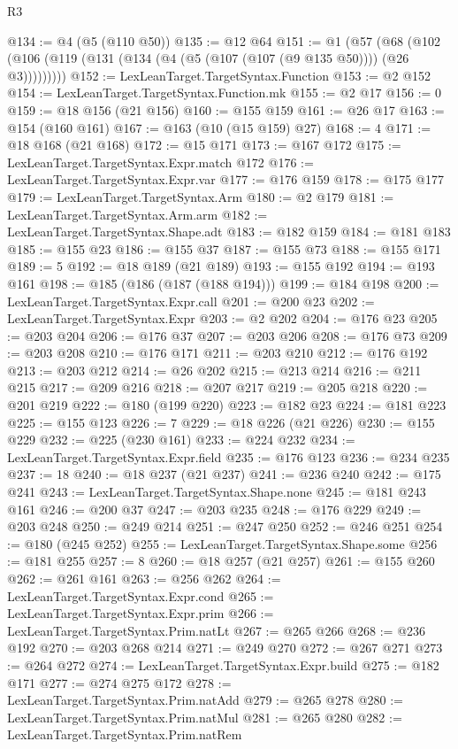 \begin{lexlean}{R3}
\begin{coremodule}
@134 := @4 (@5 (@110 @50))
@135 := @12 @64
@151 := @1
    (@57 (@68 (@102 (@106 (@119 (@131 (@134 (@4 (@5 (@107 (@107 (@9 @135 @50)))) (@26 @3)))))))))
@152 := LexLeanTarget.TargetSyntax.Function
@153 := @2 @152
@154 := LexLeanTarget.TargetSyntax.Function.mk
@155 := @2 @17
@156 := 0
@159 := @18 @156 (@21 @156)
@160 := @155 @159
@161 := @26 @17
@163 := @154 (@160 @161)
@167 := @163 (@10 (@15 @159) @27)
@168 := 4
@171 := @18 @168 (@21 @168)
@172 := @15 @171
@173 := @167 @172
@175 := LexLeanTarget.TargetSyntax.Expr.match @172
@176 := LexLeanTarget.TargetSyntax.Expr.var
@177 := @176 @159
@178 := @175 @177
@179 := LexLeanTarget.TargetSyntax.Arm
@180 := @2 @179
@181 := LexLeanTarget.TargetSyntax.Arm.arm
@182 := LexLeanTarget.TargetSyntax.Shape.adt
@183 := @182 @159
@184 := @181 @183
@185 := @155 @23
@186 := @155 @37
@187 := @155 @73
@188 := @155 @171
@189 := 5
@192 := @18 @189 (@21 @189)
@193 := @155 @192
@194 := @193 @161
@198 := @185 (@186 (@187 (@188 @194)))
@199 := @184 @198
@200 := LexLeanTarget.TargetSyntax.Expr.call
@201 := @200 @23
@202 := LexLeanTarget.TargetSyntax.Expr
@203 := @2 @202
@204 := @176 @23
@205 := @203 @204
@206 := @176 @37
@207 := @203 @206
@208 := @176 @73
@209 := @203 @208
@210 := @176 @171
@211 := @203 @210
@212 := @176 @192
@213 := @203 @212
@214 := @26 @202
@215 := @213 @214
@216 := @211 @215
@217 := @209 @216
@218 := @207 @217
@219 := @205 @218
@220 := @201 @219
@222 := @180 (@199 @220)
@223 := @182 @23
@224 := @181 @223
@225 := @155 @123
@226 := 7
@229 := @18 @226 (@21 @226)
@230 := @155 @229
@232 := @225 (@230 @161)
@233 := @224 @232
@234 := LexLeanTarget.TargetSyntax.Expr.field
@235 := @176 @123
@236 := @234 @235
@237 := 18
@240 := @18 @237 (@21 @237)
@241 := @236 @240
@242 := @175 @241
@243 := LexLeanTarget.TargetSyntax.Shape.none
@245 := @181 @243 @161
@246 := @200 @37
@247 := @203 @235
@248 := @176 @229
@249 := @203 @248
@250 := @249 @214
@251 := @247 @250
@252 := @246 @251
@254 := @180 (@245 @252)
@255 := LexLeanTarget.TargetSyntax.Shape.some
@256 := @181 @255
@257 := 8
@260 := @18 @257 (@21 @257)
@261 := @155 @260
@262 := @261 @161
@263 := @256 @262
@264 := LexLeanTarget.TargetSyntax.Expr.cond
@265 := LexLeanTarget.TargetSyntax.Expr.prim
@266 := LexLeanTarget.TargetSyntax.Prim.natLt
@267 := @265 @266
@268 := @236 @192
@270 := @203 @268 @214
@271 := @249 @270
@272 := @267 @271
@273 := @264 @272
@274 := LexLeanTarget.TargetSyntax.Expr.build
@275 := @182 @171
@277 := @274 @275 @172
@278 := LexLeanTarget.TargetSyntax.Prim.natAdd
@279 := @265 @278
@280 := LexLeanTarget.TargetSyntax.Prim.natMul
@281 := @265 @280
@282 := LexLeanTarget.TargetSyntax.Prim.natRem

\end{coremodule}
\end{lexlean}
